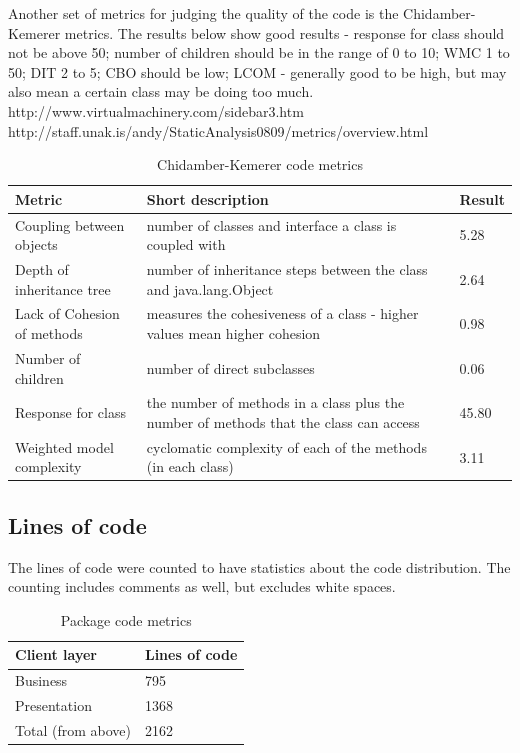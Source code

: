 \documentclass{l4proj}
\begin{document}
Another set of metrics for judging the quality of the code is the Chidamber-Kemerer metrics. The results below show good results - response for class should not be above 50; number of children should be in the range of 0 to 10; WMC 1 to 50; DIT 2 to 5; CBO should be low; LCOM - generally good to be high, but may also mean a certain class may be doing too much.
http://www.virtualmachinery.com/sidebar3.htm
http://staff.unak.is/andy/StaticAnalysis0809/metrics/overview.html

\begin{table}[H]
\small
\caption{Chidamber-Kemerer code metrics}
\centering
\def\arraystretch{1.5}
\begin{tabular}{p{4cm}p{5cm}p{2.5cm}}
\hline
Metric & Short description & Result\\
\hline
Coupling between objects & number of classes and interface a class is coupled with & 5.28\\ 
Depth of inheritance tree & number of inheritance steps between the class and java.lang.Object & 2.64\\
Lack of Cohesion of methods & measures the cohesiveness of a class - higher values mean higher cohesion & 0.98\\
Number of children & number of direct subclasses & 0.06\\
Response for class & the number of methods in a class plus the number of methods that the class can access & 45.80\\
Weighted model complexity & cyclomatic complexity of each of the methods (in each class) & 3.11\\
\hline
\end{tabular}
\label{table:ck-codemetrics}
\end{table}

\subsection{Lines of code}
The lines of code were counted to have statistics about the code distribution. The counting includes comments as well, but excludes white spaces.

\begin{table}[H]
\small
\caption{Package code metrics}
\centering
\def\arraystretch{1.5}
\begin{tabular}{p{3cm}p{3cm}}
\hline
Client layer & Lines of code\\
\hline
Business & 795\\
Presentation & 1368\\
\hline
Total (from above) & 2162\\
\hline
\end{tabular}
\label{table:package-codemetrics}
\end{table}
\end{document}
